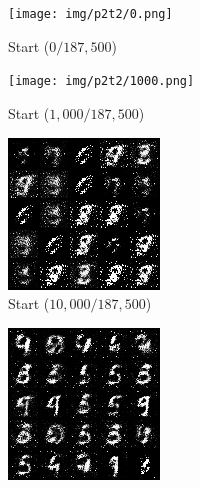 \begin{figure}[!htbp]
  \centering
  \begin{subfigure}[b]{0.3\textwidth}
    \texttt{[image: img/p2t2/0.png]}
    \caption{Start ($0/187,500$)}
  \end{subfigure}
  \begin{subfigure}[b]{0.3\textwidth}
    \texttt{[image: img/p2t2/1000.png]}
    \caption{Start ($1,000/187,500$)}
  \end{subfigure}
  \begin{subfigure}[b]{0.3\textwidth}
    \includegraphics[width=\textwidth]{img/p2t2/10000.png}
    \caption{Start ($10,000/187,500$)}
  \end{subfigure}
  \begin{subfigure}[b]{0.3\textwidth}
    \includegraphics[width=\textwidth]{img/p2t2/20000.png}

\end{subfigure}
\end{figure}
